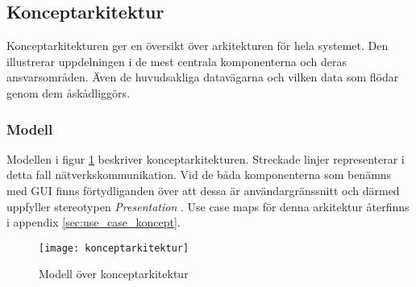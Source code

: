 \subsection{Konceptarkitektur}
Konceptarkitekturen ger en översikt över arkitekturen för hela systemet. Den illustrerar uppdelningen i de mest centrala komponenterna och deras ansvarsområden. Även de huvudsakliga datavägarna och vilken data som flödar genom dem åskådliggörs.

\subsubsection{Modell}
Modellen i figur \ref{fig:konceptarkitektur} beskriver konceptarkitekturen. Streckade linjer representerar i detta fall nätverkskommunikation. Vid de båda komponenterna som benämns med GUI finns förtydliganden över att dessa är användargränssnitt och därmed uppfyller stereotypen \textit{Presentation} \cite[p.~50--51]{bib-architecture-primer}. Use case maps för denna arkitektur återfinns i appendix \ref{sec:use_case_koncept}.

\begin{figure}[h]
    \centering
    \texttt{[image: konceptarkitektur]}
    \caption{Modell över konceptarkitektur}
    \label{fig:konceptarkitektur}
\end{figure}

